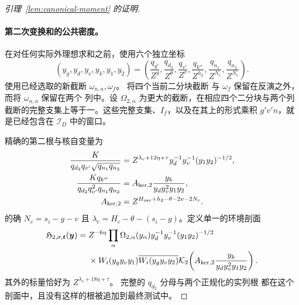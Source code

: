 \documentclass[11pt,a4paper]{article}
\numberwithin{equation}{section}
\numberwithin{figure}{section}
\theoremstyle{definition}
\theoremstyle{remark}
\begin{document}
\begin{proof}[引理~\ref{lem:canonical-moment} 的证明]
\paragraph{第二次变换和的公共密度。}
在对任何实际外理想求和之前，使用六个独立坐标
\[
 (y_g,y_d,y_v,y_k,y_1,y_2)
 =\left(\frac{q_{g'}}{Z^g},\frac{q_{d_2}}{Z^\theta},
 \frac{q_{v'}}{Z^v},\frac{q_{k''}}{Z^{h_2}},
 \frac{q_{n_1}}{Z^{N_c}},\frac{q_{n_2}}{Z^{N_c}}\right).
\]
使用已经选取的新截断 \(\omega_{n,a},\omega_f\)。
将四个当前二分块截断
与 \(\omega_f\) 保留在反演之外，而将 \(\omega_{n,a}\) 保留在两个
列中。设 \(\Omega_{2,\alpha}\) 为更大的截断，在相应四个二分块与两个列
截断的完整支集上等于一。这些完整支集、\(I_f\)，以及在其上的形式乘积
\(g'v'n\)，就是已经包含在 \(\mathcal I_D\) 中的窗口。

精确的第二根与核自变量为
\begin{equation}\label{eq:inverse-second-root-kernel}
 \begin{split}
 \frac{K}{q_{d_2}q_{v'}\sqrt{q_{n_1}q_{n_2}}}
 &=Z^{\lambda_c+12\eta+\tau}y_d^{-1}y_v^{-1}(y_1y_2)^{-1/2},\\
 \frac{Kq_{k''}}{q_{d_2}q_{v'}^2q_{n_1}q_{n_2}}
 &=A_{{\rm ker},2}\frac{y_k}{y_dy_v^2y_1y_2},\\
 A_{{\rm ker},2}&=Z^{H_{\rm use}+h_2-\theta-2v-2N_c}.
 \end{split}
\end{equation}
的确 \(N_c=s_i-g-v\) 且
\(\lambda_c=H_c-\theta-(s_i-g)\)。定义单一的环境剖面
\begin{equation}\label{eq:inverse-second-profile}
 \begin{split}
 \mathfrak H_{2,\sigma,\boldsymbol t}(\boldsymbol y)={}&Z^{-6\eta}
 \prod_\alpha\Omega_{2,\alpha}(y_\alpha)
 y_d^{-1}y_v^{-1}(y_1y_2)^{-1/2}\\
 &\times W_i(y_gy_vy_1)\overline{W_i(y_gy_vy_2)}
 \mathcal K_2\!\left(A_{{\rm ker},2}\frac{y_k}{y_dy_v^2y_1y_2}\right).
 \end{split}
\end{equation}
其外的标量恰好为 \(Z^{\lambda_c+18\eta+\tau}\)。
完整的 \(q_{d_2}\) 分母与两个正规化的实列根
都在这个剖面中，且没有这样的根被追加到最终测试中。


\end{proof}
\end{document}
